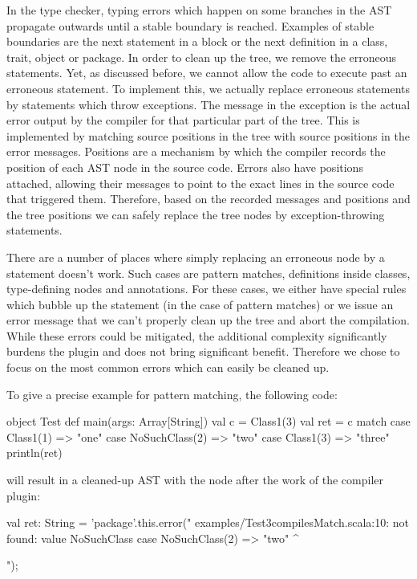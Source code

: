In the type checker, typing errors which happen on some branches in the AST propagate outwards until a stable boundary is reached. Examples of stable boundaries are the next statement in a block or the next definition in a class, trait, object or package. In order to clean up the tree, we remove the erroneous statements. Yet, as discussed before, we cannot allow the code to execute past an erroneous statement. To implement this, we actually replace erroneous statements by statements which throw exceptions. The message in the exception is the actual error output by the compiler for that particular part of the tree. This is implemented by matching source positions in the tree with source positions in the error messages. Positions are a mechanism by which the compiler records the position of each AST node in the source code. Errors also have positions attached, allowing their messages to point to the exact lines in the source code that triggered them. Therefore, based on the recorded messages and positions and the tree positions we can safely replace the tree nodes by exception-throwing statements.

There are a number of places where simply replacing an erroneous node by a statement doesn't work. Such cases are pattern matches, definitions inside classes, type-defining nodes and annotations. For these cases, we either have special rules which bubble up the statement (in the case of pattern matches) or we issue an error message that we can't properly clean up the tree and abort the compilation. While these errors could be mitigated, the additional complexity significantly burdens the plugin and does not bring significant benefit. Therefore we chose to focus on the most common errors which can easily be cleaned up.



To give a precise example for pattern matching, the following code:

\begin{lstlisting-nobreak}
object Test {
   	def main(args: Array[String]) {
   		val c = Class1(3)
	   	val ret = c match {
	   		case Class1(1) => "one"
	   		case NoSuchClass(2) => "two"
	   		case Class1(3) => "three"
	   	}
	    println(ret)
	}
}
\end{lstlisting-nobreak}

will result in a cleaned-up AST with the node after the work of the compiler plugin:

\begin{lstlisting-nobreak}
val ret: String = 'package'.this.error("
examples/Test3compilesMatch.scala:10: not found: value NoSuchClass
	   		case NoSuchClass(2) => "two"
                             ^

");
\end{lstlisting-nobreak}
